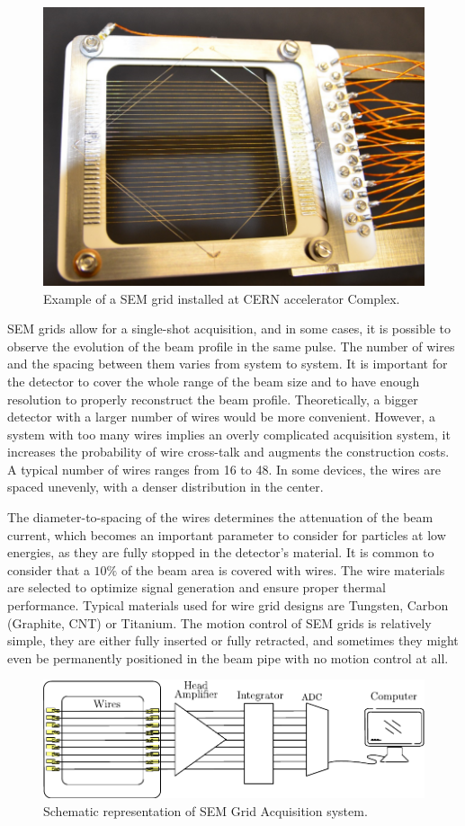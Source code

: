 \begin{figure}[h]
    \centering
    \includegraphics[width=0.6\columnwidth]{SEMGrid/semgrid.png}
    \caption{Example of a SEM grid installed at CERN accelerator Complex. }
    \label{fig:SEMgrid}
\end{figure}

SEM grids allow for a single-shot acquisition, and in some cases, it is possible to observe the evolution of the beam profile in the same pulse. The number of wires and the spacing between them varies from system to system. It is important for the detector to cover the whole range of the beam size and to have enough resolution to properly reconstruct the beam profile. Theoretically, a bigger detector with a larger number of wires would be more convenient. However, a system with too many wires implies an overly complicated acquisition system, it increases the probability of wire cross-talk and augments the construction costs. A typical number of wires ranges from 16 to 48. In some devices, the wires are spaced unevenly, with a denser distribution in the center. 

The diameter-to-spacing of the wires determines the attenuation of the beam current, which becomes an important parameter to consider for particles at low energies, as they are fully stopped in the detector's material. It is common to consider that a $10 \%$ of the beam area is covered with wires. The wire materials are selected to optimize signal generation and ensure proper thermal performance. Typical materials used for wire grid designs are Tungsten, Carbon (Graphite, CNT) or Titanium. The motion control of SEM grids is relatively simple, they are either fully inserted or fully retracted, and sometimes they might even be permanently positioned in the beam pipe with no motion control at all. 

\begin{figure}[h]
    \centering
    \includegraphics[width=0.9\columnwidth]{SEMgridDataADq/SEMdataAdc.pdf}
    \caption{Schematic representation of SEM Grid Acquisition system. }
    \label{fig:SEMGridReadOutSystem}
\end{figure}

